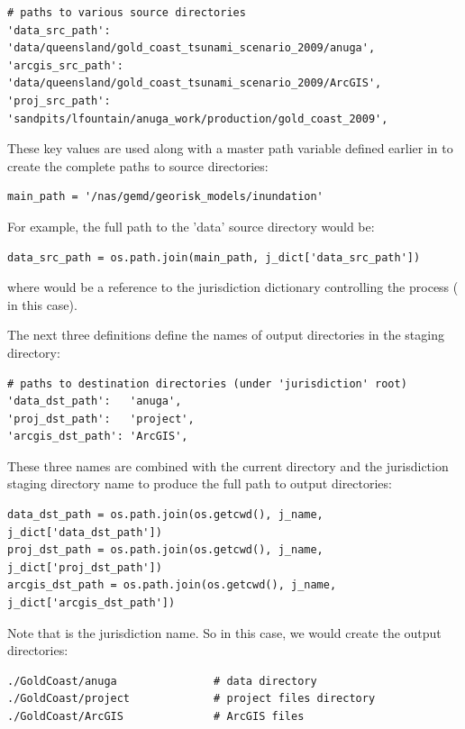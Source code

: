 \documentclass{manual}
\begin{document}
\begin{verbatim}
# paths to various source directories
'data_src_path':   'data/queensland/gold_coast_tsunami_scenario_2009/anuga',
'arcgis_src_path': 'data/queensland/gold_coast_tsunami_scenario_2009/ArcGIS',
'proj_src_path':   'sandpits/lfountain/anuga_work/production/gold_coast_2009',
\end{verbatim}

\pagebreak

These key values are used along with a master path variable defined earlier in
 to create the complete paths to source directories:

\begin{verbatim}
main_path = '/nas/gemd/georisk_models/inundation'
\end{verbatim}

For example, the full path to the 'data' source directory would be:

\begin{verbatim}
data_src_path = os.path.join(main_path, j_dict['data_src_path'])
\end{verbatim}

where  would be a reference to the jurisdiction dictionary controlling the
process ( in this case).

The next three definitions define the names of output directories in the staging directory:

\begin{verbatim}
# paths to destination directories (under 'jurisdiction' root)
'data_dst_path':   'anuga',
'proj_dst_path':   'project',
'arcgis_dst_path': 'ArcGIS',
\end{verbatim}

These three names are combined with the current directory and the jurisdiction
staging directory name to produce the full path to output directories:

\begin{verbatim}
data_dst_path = os.path.join(os.getcwd(), j_name, j_dict['data_dst_path'])
proj_dst_path = os.path.join(os.getcwd(), j_name, j_dict['proj_dst_path'])
arcgis_dst_path = os.path.join(os.getcwd(), j_name, j_dict['arcgis_dst_path'])
\end{verbatim}

Note that  is the jurisdiction name.  So in this case, we would
create the output directories:

\begin{verbatim}
./GoldCoast/anuga               # data directory
./GoldCoast/project             # project files directory
./GoldCoast/ArcGIS              # ArcGIS files
\end{verbatim}
\end{document}
